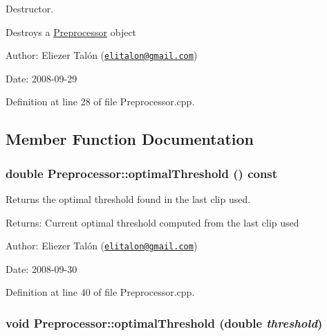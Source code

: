 Destructor. 

Destroys a \hyperlink{class_preprocessor}{Preprocessor} object

\begin{Desc}
\item[Author:]Eliezer Talón (\href{mailto:elitalon@gmail.com}{\tt elitalon@gmail.com}) \end{Desc}
\begin{Desc}
\item[Date:]2008-09-29 \end{Desc}


Definition at line 28 of file Preprocessor.cpp.

\subsection{Member Function Documentation}
\hypertarget{class_preprocessor_8cc19d799c87198f97356d41606aa4ac}{
\subsubsection[optimalThreshold]{\setlength{\rightskip}{0pt plus 5cm}double Preprocessor::optimalThreshold () const}}
\label{class_preprocessor_8cc19d799c87198f97356d41606aa4ac}


Returns the optimal threshold found in the last clip used. 

\begin{Desc}
\item[Returns:]Current optimal threshold computed from the last clip used\end{Desc}
\begin{Desc}
\item[Author:]Eliezer Talón (\href{mailto:elitalon@gmail.com}{\tt elitalon@gmail.com}) \end{Desc}
\begin{Desc}
\item[Date:]2008-09-30 \end{Desc}


Definition at line 40 of file Preprocessor.cpp.\hypertarget{class_preprocessor_18a36d341721334d6bd045f2ce1b1538}{
\subsubsection[optimalThreshold]{\setlength{\rightskip}{0pt plus 5cm}void Preprocessor::optimalThreshold (double {\em threshold})}}
\label{class_preprocessor_18a36d341721334d6bd045f2ce1b1538}


